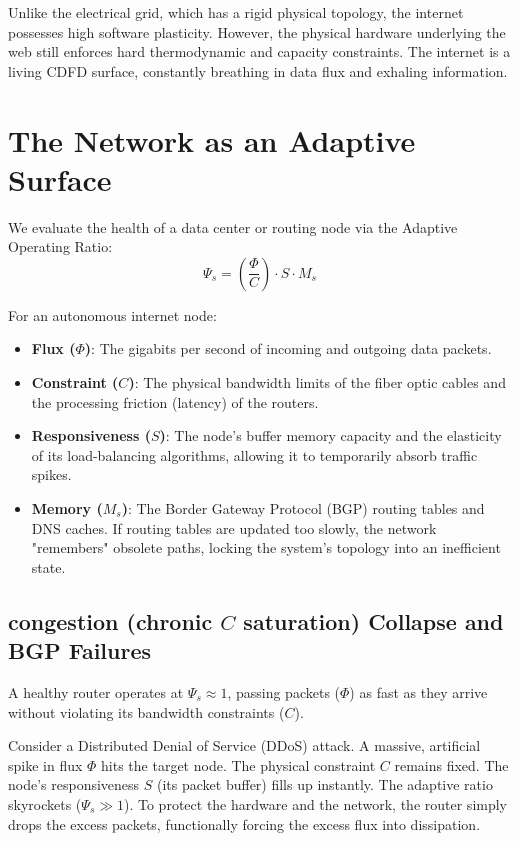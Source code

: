 \documentclass[11pt,a4paper]{article}
\begin{document}
Unlike the electrical grid, which has a rigid physical topology, the internet possesses high software plasticity. However, the physical hardware underlying the web still enforces hard thermodynamic and capacity constraints. The internet is a living CDFD surface, constantly breathing in data flux and exhaling information.

\section{The Network as an Adaptive Surface}
We evaluate the health of a data center or routing node via the Adaptive Operating Ratio:
\begin{equation}
    \Psi_s = \left( \frac{\Phi}{C} \right) \cdot S \cdot M_s
\end{equation}

For an autonomous internet node:
\begin{itemize}
    \item \textbf{Flux ($\Phi$)}: The gigabits per second of incoming and outgoing data packets.
    \item \textbf{Constraint ($C$)}: The physical bandwidth limits of the fiber optic cables and the processing friction (latency) of the routers.
    \item \textbf{Responsiveness ($S$)}: The node's buffer memory capacity and the elasticity of its load-balancing algorithms, allowing it to temporarily absorb traffic spikes.
    \item \textbf{Memory ($M_s$)}: The Border Gateway Protocol (BGP) routing tables and DNS caches. If routing tables are updated too slowly, the network "remembers" obsolete paths, locking the system's topology into an inefficient state.
\end{itemize}

\subsection{congestion (chronic $C$ saturation) Collapse and BGP Failures}
A healthy router operates at $\Psi_s \approx 1$, passing packets ($\Phi$) as fast as they arrive without violating its bandwidth constraints ($C$).

Consider a Distributed Denial of Service (DDoS) attack. A massive, artificial spike in flux $\Phi$ hits the target node. The physical constraint $C$ remains fixed. The node's responsiveness $S$ (its packet buffer) fills up instantly. The adaptive ratio skyrockets ($\Psi_s \gg 1$). To protect the hardware and the network, the router simply drops the excess packets, functionally forcing the excess flux into dissipation.
\end{document}
